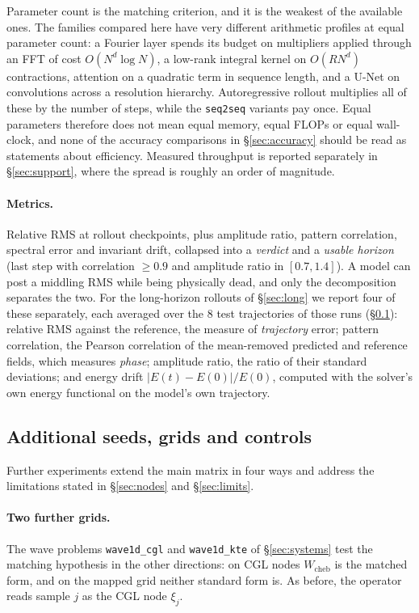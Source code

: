 \documentclass[11pt]{article}
\theoremstyle{definition}
\theoremstyle{remark}
\newcommand{\Wc}{W_{\mathrm{cheb}}}
\begin{document}
Parameter count is the matching criterion, and it is the weakest of the
available ones. The families compared here have very different arithmetic
profiles at equal parameter count: a Fourier layer spends its budget on
multipliers applied through an FFT of cost $O(N^d\log N)$, a low-rank integral
kernel on $O(RN^d)$ contractions, attention on a quadratic term in sequence
length, and a U-Net on convolutions across a resolution hierarchy. Autoregressive
rollout multiplies all of these by the number of steps, while the
\texttt{seq2seq} variants pay once. Equal parameters therefore does not mean
equal memory, equal FLOPs or equal wall-clock, and none of the accuracy
comparisons in \S\ref{sec:accuracy} should be read as statements about
efficiency. Measured throughput is reported separately in \S\ref{sec:support},
where the spread is roughly an order of magnitude.

\paragraph{Metrics.} Relative RMS at rollout checkpoints, plus amplitude ratio,
pattern correlation, spectral error and invariant drift, collapsed into a
\emph{verdict} and a \emph{usable horizon} (last step with correlation $\ge0.9$
and amplitude ratio in $[0.7,1.4]$). A model can post a middling RMS while being
physically dead, and only the decomposition separates the two. For the
long-horizon rollouts of \S\ref{sec:long} we report four of these separately,
each averaged over the $8$ test trajectories of those runs (\S\ref{sec:extras}):
relative RMS against the
reference, the measure of \emph{trajectory} error; pattern correlation, the
Pearson correlation of the mean-removed predicted and reference fields, which
measures \emph{phase}; amplitude ratio, the ratio of their standard deviations;
and energy drift $|E(t)-E(0)|/E(0)$, computed with the solver's own energy
functional on the model's own trajectory.

\subsection{Additional seeds, grids and controls}
\label{sec:extras}

Further experiments extend the main matrix in four ways and address the
limitations stated in \S\ref{sec:nodes} and \S\ref{sec:limits}.

\paragraph{Two further grids.} The wave problems \texttt{wave1d\_cgl} and
\texttt{wave1d\_kte} of \S\ref{sec:systems} test the matching hypothesis in the
other directions: on CGL nodes $\Wc$ is the matched form, and on the mapped grid
neither standard form is. As before, the operator reads sample $j$ as the CGL
node $\xi_j$.
\end{document}
